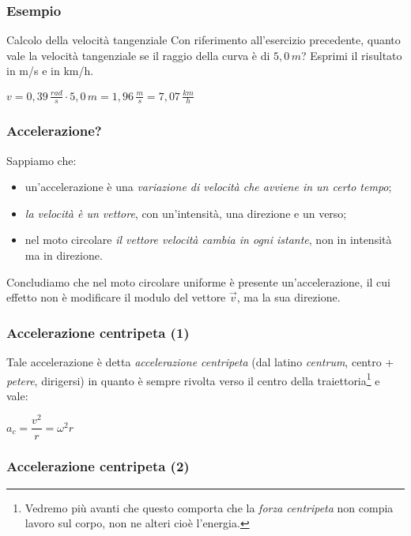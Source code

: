 \documentclass[]{beamer}
\theoremstyle{plain}
\begin{document}
\begin{frame}
  \frametitle{Esempio}
  \begin{exampleblock}{Calcolo della velocità tangenziale}
    \small{Con riferimento all'esercizio precedente, quanto vale la velocità tangenziale se il raggio della curva è di $ 5,0 \, m $? Esprimi il risultato in m/s e in km/h.}
  \end{exampleblock}\pause

  \begin{center}
    $ v =  0,39 \,\frac{rad}{s} \cdot 5,0 \, m = 1,96 \, \frac{m}{s} = 7,07 \, \frac{km}{h} $
  \end{center} 
\end{frame}




\begin{frame}
  \frametitle{Accelerazione?}
  Sappiamo che:
  \begin{itemize}
    \item un'accelerazione è una \emph<1>{variazione di velocità che avviene in un certo tempo};\pause
    \item \emph<2>{la velocità  è un vettore}, con un'intensità, una direzione e un verso;\pause
    \item nel moto circolare \emph<3>{il vettore velocità cambia in ogni istante}, non in intensità ma in direzione.\pause
  \end{itemize}
  Concludiamo che \alert{nel moto circolare uniforme è presente un'accelerazione}, il cui effetto non è modificare il modulo del vettore $ \vec{v} $, ma la sua \alert{direzione}.
\end{frame}


\begin{frame}
  \frametitle{Accelerazione centripeta (1)}
Tale accelerazione è detta \emph{accelerazione centripeta} (dal latino \emph{centrum}, centro + \emph{petere}, dirigersi) in quanto è sempre rivolta verso il centro della traiettoria\footnote{Vedremo più avanti che questo comporta che la \emph{forza centripeta} non compia lavoro sul corpo, non ne alteri cioè l'energia.} e vale:
\begin{center}
\colorbox{blue!30}{$ a_c = \dfrac{v^2}{r} = \omega^2 r $}
\end{center}
\end{frame}

\begin{frame}
\frametitle{Accelerazione centripeta (2)}

\begin{figure}
\end{figure}
\end{frame}
\end{document}
